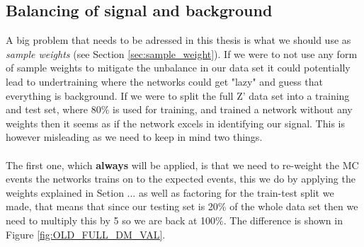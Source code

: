 \documentclass[14pt, a4paper]{book}
\begin{document}
\subsection{Balancing of signal and background}\label{sec:NN_balance_rst}
\graphicspath{{../../figures/}}
A big problem that needs to be adressed in this thesis is what we should use as \textit{sample weights} (see Section \ref{sec:sample_weight}). If we were to not use any form of sample weights to mitigate the unbalance in our data set 
it could potentially lead to undertraining where the networks could get "lazy" and guess that everything is background. If we were to split the full Z' data set into a training and test set, where 80\% is used for training, and trained a network without any weights then it seems as if the network excels in identifying our signal. 
This is however misleading as we need to keep in mind two things.\\
\\The first one, which \textbf{always} will be applied, is that we need to re-weight the MC events the networks trains on to the expected events, this we do by applying the weights explained in Setion ... as well as factoring for the train-test split we made, 
that means that since our testing set is 20\% of the whole data set then we need to multiply this by 5 so we are back at 100\%. The difference is shown in Figure \ref{fig:OLD_FULL_DM_VAL}.\\ 
\end{document}
